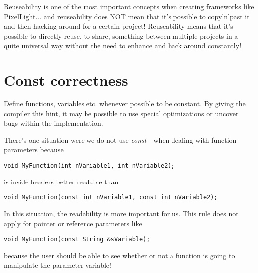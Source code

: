 Reuseability is one of the most important concepts when creating frameworks like PixelLight... and reuseability does NOT mean that it's possible to copy'n'past it and then hacking around for a certain project! Reuseability means that it's possible to directly reuse, to share, something between multiple projects in a quite universal way without the need to enhance and hack around constantly!




\section{Const correctness}
Define functions, variables etc. whenever possible to be constant. By giving the compiler this hint, it may be possible to use special optimizations or uncover bugs within the implementation.

There's one situation were we do not use \emph{const} - when dealing with function parameters because

\begin{lstlisting}[caption=Function parameters]
void MyFunction(int nVariable1, int nVariable2);
\end{lstlisting}

is inside headers better readable than

\begin{lstlisting}[caption=Constant function parameters]
void MyFunction(const int nVariable1, const int nVariable2);
\end{lstlisting}

In this situation, the readability is more important for us. This rule does not apply for pointer or reference parameters like

\begin{lstlisting}[caption=Constant function pointer/reference parameter]
void MyFunction(const String &sVariable);
\end{lstlisting}

because the user should be able to see whether or not a function is going to manipulate the parameter variable!
